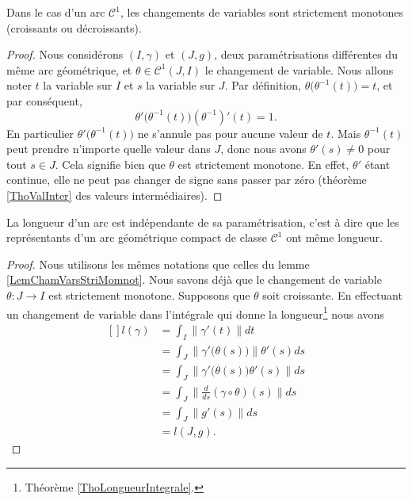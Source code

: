 \begin{lemma}       \label{LemChamVarsStriMomnot}
Dans le cas d'un arc $\mathcal{C}^1$, les changements de variables sont strictement monotones (croissants ou décroissants).
\end{lemma}

\begin{proof}
Nous considérons $(I,\gamma)$ et $(J,g)$, deux paramétrisations différentes du même arc géométrique, et $\theta\in \mathcal{C}^1(J,I)$ le changement de variable. Nous allons noter $t$ la variable sur $I$ et $s$ la variable sur $J$. Par définition, $\theta\big( \theta^{-1}(t) \big)=t$, et par conséquent,
\begin{equation}
    \theta'\big( \theta^{-1}(t) \big)(\theta^{-1})'(t)=1.
\end{equation}
En particulier $\theta'\big( \theta^{-1}(t) \big)$ ne s'annule pas pour aucune valeur de $t$. Mais $\theta^{-1}(t)$ peut prendre n'importe quelle valeur dans $J$, donc nous avons $\theta'(s)\neq 0$ pour tout $s\in J$. Cela signifie bien que $\theta$ est strictement monotone. En effet, $\theta'$ étant continue, elle ne peut pas changer de signe sans passer par zéro (théorème \ref{ThoValInter} des valeurs intermédiaires).
\end{proof}

\begin{theorem}     \label{ThoLongArcGeom}
La longueur d'un arc est indépendante de sa paramétrisation, c'est à dire que les représentants d'un arc géométrique compact de classe $\mathcal{C}^1$ ont même longueur. 
\end{theorem}

\begin{proof}
Nous utilisons les mêmes notations que celles du lemme \ref{LemChamVarsStriMomnot}. Nous savons déjà que le changement de variable $\theta \colon J\to I$ est strictement monotone. Supposons que $\theta$ soit croissante.
En effectuant un changement de variable dans l'intégrale qui donne la longueur\footnote{Théorème \ref{ThoLongueurIntegrale}.} nous avons
\begin{equation}
    \begin{aligned}[]
        l(\gamma)&=\int_I\| \gamma'(t) \|dt\\
            &=\int_J\| \gamma'\big( \theta(s) \big) \|\theta'(s)ds\\
            &=\int_J\| \gamma'\big( \theta(s) \big)\theta'(s) \|ds\\
            &=\int_J\| \frac{ d }{ ds }(\gamma\circ\theta)(s) \|ds\\
            &=\int_J\| g'(s) \|ds\\
            &=l(J,g).
    \end{aligned}
\end{equation}
\end{proof}

